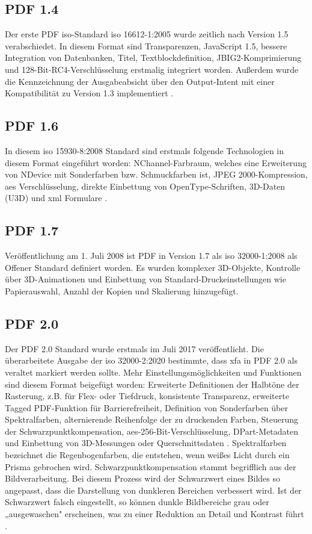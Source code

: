 \subsection{PDF 1.4}
Der erste PDF \gls{iso}-Standard \gls{iso} 16612-1:2005 wurde zeitlich nach Version 1.5 verabschiedet. In diesem Format sind Transparenzen, JavaScript 1.5, bessere Integration von Datenbanken, Titel, Textblockdefinition, JBIG2-Komprimierung und 128-Bit-RC4-Verschlüsselung erstmalig integriert worden\cite{proj-consult}. Außerdem wurde die Kennzeichnung der Ausgabeabsicht über den Output-Intent mit einer Kompatibilität zu Version 1.3 implementiert \cite{schneeberger}.

\subsection{PDF 1.6}
In diesem \gls{iso} 15930-8:2008 Standard sind erstmals folgende Technologien in diesem Format eingeführt worden: NChannel-Farbraum, welches eine Erweiterung von NDevice mit Sonderfarben bzw. Schmuckfarben ist, JPEG 2000-Kompression, \gls{aes} Verschlüsselung, direkte Einbettung von OpenType-Schriften, 3D-Daten (U3D) und \gls{xml} Formulare \cite{proj-consult}.

\subsection{PDF 1.7}
Veröffentlichung am 1. Juli 2008 ist PDF in Version 1.7 als \gls{iso} 32000-1:2008 als Offener Standard definiert worden. Es wurden komplexer 3D-Objekte, Kontrolle über 3D-Animationen und Einbettung von Standard-Druckeinstellungen wie Papierauswahl, Anzahl der Kopien und Skalierung hinzugefügt\cite{proj-consult}.

\subsection{PDF 2.0}
Der PDF 2.0 Standard wurde erstmals im Juli 2017 veröffentlicht. Die überarbeitete Ausgabe der \gls{iso} 32000-2:2020 bestimmte, dass \gls{xfa} in PDF 2.0 als veraltet markiert werden sollte. Mehr Einstellungsmöglichkeiten und Funktionen sind diesem Format beigefügt worden: Erweiterte Definitionen der Halbtöne der Rasterung, z.B. für Flex- oder Tiefdruck, konsistente Transparenz, erweiterte Tagged PDF-Funktion für Barrierefreiheit, Definition von Sonderfarben über Spektralfarben, alternierende Reihenfolge der zu druckenden Farben, Steuerung der Schwarzpunktkompensation, \gls{aes}-256-Bit-Verschlüsselung, DPart-Metadaten und Einbettung von 3D-Messungen oder Querschnittsdaten \cite{proj-consult}. Spektralfarben bezeichnet die Regenbogenfarben, die entstehen, wenn weißes Licht durch ein Prisma gebrochen wird. Schwarzpunktkompensation stammt begrifflich aus der Bildverarbeitung. Bei diesem Prozess wird der Schwarzwert eines Bildes so angepasst, dass die Darstellung von dunkleren Bereichen verbessert wird. Ist der Schwarzwert falsch eingestellt, so können dunkle Bildbereiche grau oder „ausgewaschen" erscheinen, was zu einer Reduktion an Detail und Kontrast führt \cite{schwarz}.